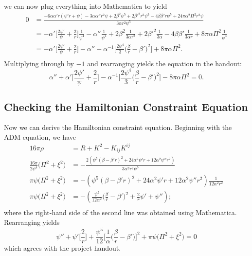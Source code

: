 \documentclass[12pt]{article}
\numberwithin{equation}{section}
\begin{document}
we can now plug everything into Mathematica to yield
\begin{equation}
\begin{aligned}
0 &= \frac{-6 \alpha \alpha' r (\psi' r + \psi ) - 3 \alpha \alpha'' r^2 \psi + 2 \beta^2 \psi^5 + 2 \beta'^2 r^2 \psi ^5-4 \beta \beta' r \psi^5 + 24 \pi  \alpha^2 \Pi^2 r^2 \psi }{3 \alpha  r^2 \psi^5} \\
&= - \alpha' \Big[ \frac{2 \psi'}{\psi} + \frac{2}{r} \Big] \frac{1}{\psi^4} - \alpha'' \frac{1}{\psi^4} + 2 \beta^2 \frac{1}{3 \alpha r^2} + 2 \beta'^2 \frac{1}{3 \alpha} - 4 \beta \beta' \frac{1}{3 \alpha r} + 8 \pi \alpha \Pi^2 \frac{1}{\psi^4} \\
&= - \alpha' \Big[ \frac{2 \psi'}{\psi} + \frac{2}{r} \Big] - \alpha'' + \alpha^{-1} \Big[ \frac{2 \psi^4}{3} \Big( \frac{\beta}{r} - \beta' \Big)^2 \Big] + 8 \pi \alpha \Pi^2. \\
\end{aligned}
\end{equation}
Multiplying through by $-1$ and rearranging yields the equation in the handout:
\begin{equation}
\boxed{ \alpha'' + \alpha' \Big[ \frac{2 \psi'}{\psi} + \frac{2}{r} \Big] - \alpha^{-1} \Big[ \frac{2 \psi^4}{3} \Big( \frac{\beta}{r} - \beta' \Big)^2 \Big] - 8 \pi \alpha \Pi^2 = 0}.
\end{equation}

\subsection{Checking the Hamiltonian Constraint Equation}
Now we can derive the Hamiltonian constraint equation.  Beginning with the ADM equation, we have
\begin{equation}
\begin{aligned}
16 \pi \rho &= R + K^2 - K_{ij} K^{ij}\\
\frac{16 \pi}{2 \psi^{4}} \Big( \Pi^2 + \xi^2 \Big) &= -\frac{2 \left( \psi^5 (\beta - \beta' r)^2 + 24 \alpha^2 \psi' r + 12 \alpha^2 \psi'' r^2 \right)}{3 \alpha^2 r^2 \psi^5} \\
\pi \psi \Big( \Pi^2 + \xi^2 \Big) &= -\left( \psi^5 (\beta - \beta' r)^2 + 24 \alpha^2 \psi' r + 12 \alpha^2 \psi'' r^2 \right) \frac{1}{12 \alpha^2 r^2} \\
\pi \psi \Big( \Pi^2 + \xi^2 \Big) &= -\left( \frac{\psi^5}{12 \alpha^2} \Big( \frac{\beta}{r} - \beta' \Big)^2 + \frac{2}{r} \psi' + \psi'' \right); \\
\end{aligned}
\end{equation}
where the right-hand side of the second line was obtained using Mathematica.  Rearranging yields
\begin{equation}
\boxed{ \psi'' + \psi' \Big[ \frac{2}{r} \Big] + \frac{\psi^5}{12} \Big[ \frac{1}{\alpha} \Big( \frac{\beta}{r} - \beta' \Big) \Big]^2 + \pi \psi \Big( \Pi^2 + \xi^2 \Big) = 0 }
\end{equation}
which agrees with the project handout.
\end{document}
